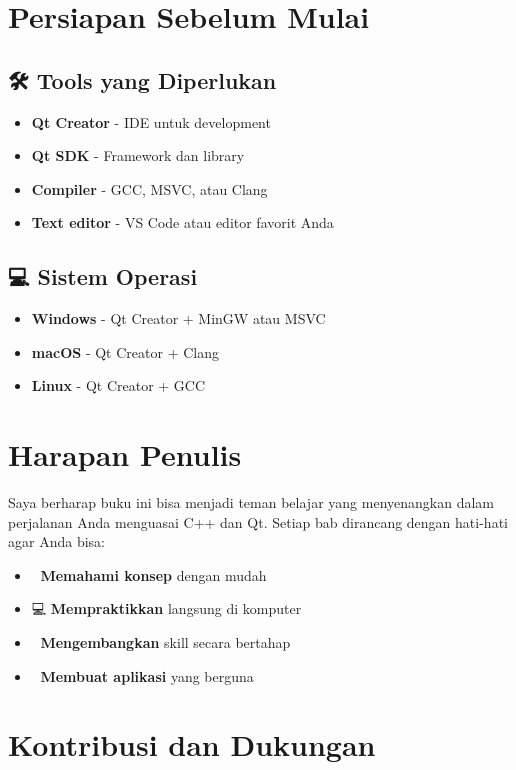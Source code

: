 \section*{Persiapan Sebelum Mulai}

\subsection*{🛠️ Tools yang Diperlukan}
\begin{itemize}
\item \textbf{Qt Creator} - IDE untuk development
\item \textbf{Qt SDK} - Framework dan library
\item \textbf{Compiler} - GCC, MSVC, atau Clang
\item \textbf{Text editor} - VS Code atau editor favorit Anda
\end{itemize}

\subsection*{💻 Sistem Operasi}
\begin{itemize}
\item \textbf{Windows} - Qt Creator + MinGW atau MSVC
\item \textbf{macOS} - Qt Creator + Clang
\item \textbf{Linux} - Qt Creator + GCC
\end{itemize}

\section*{Harapan Penulis}

Saya berharap buku ini bisa menjadi teman belajar yang menyenangkan dalam perjalanan Anda menguasai C++ dan Qt. Setiap bab dirancang dengan hati-hati agar Anda bisa:

\begin{itemize}
\item 🎯 \textbf{Memahami konsep} dengan mudah
\item 💻 \textbf{Mempraktikkan} langsung di komputer
\item 🚀 \textbf{Mengembangkan} skill secara bertahap
\item 🎨 \textbf{Membuat aplikasi} yang berguna
\end{itemize}

\section*{Kontribusi dan Dukungan}

